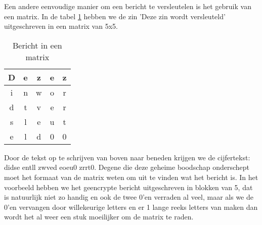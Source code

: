 Een andere eenvoudige manier om een bericht te versleutelen is het gebruik van een matrix. In de tabel \ref{tab:matrix} hebben we de zin 'Deze zin wordt versleuteld' uitgeschreven in een matrix van 5x5.
\begin{table}[h]
\centering
\begin{tabular}{|c|c|c|c|c|}
\hline
	D &
	e &
	z &
	e &
	z \\
\hline
	i &
	n &
	w &
	o &
	r \\
\hline
	d &
	t &
	v &
	e &
	r \\
\hline
	s &
	l &
	e &
	u &
	t \\
\hline
	e &
	l &
	d &
	0 &
	0 \\
\hline
\end{tabular}
\caption{Bericht in een matrix}
\label{tab:matrix}
\end{table}
Door de tekst op te schrijven van boven naar beneden krijgen we de cijfertekst: didse entll zwved eoeu0 zrrt0. Degene die deze geheime boodschap onderschept moet het formaat van de matrix weten om uit te vinden wat het bericht is. In het voorbeeld hebben we het geencrypte bericht uitgeschreven in blokken van 5, dat is natuurlijk niet zo handig en ook de twee 0'en verraden al veel, maar als we de 0'en vervangen door willekeurige letters en er 1 lange reeks letters van maken dan wordt het al weer een stuk moeilijker om de matrix te raden.

